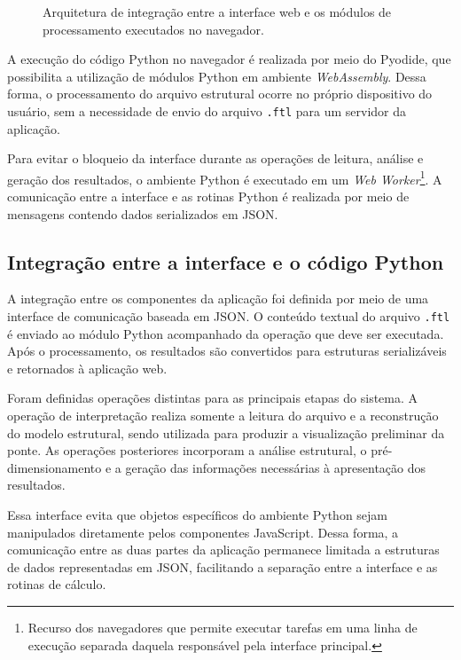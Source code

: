 \begin{figure}[H]
    \centering
    \caption{Arquitetura de integração entre a interface web e os módulos de processamento executados no navegador.}
    \label{fig:arquitetura-web}
    
\end{figure}

A execução do código Python no navegador é realizada por meio do Pyodide, que possibilita a utilização de módulos Python em ambiente \textit{WebAssembly}. Dessa forma, o processamento do arquivo estrutural ocorre no próprio dispositivo do usuário, sem a necessidade de envio do arquivo \texttt{.ftl} para um servidor da aplicação.

Para evitar o bloqueio da interface durante as operações de leitura, análise e geração dos resultados, o ambiente Python é executado em um \textit{Web Worker}\footnote{Recurso dos navegadores que permite executar tarefas em uma linha de execução separada daquela responsável pela interface principal.}. A comunicação entre a interface e as rotinas Python é realizada por meio de mensagens contendo dados serializados em \gls{JSON}.

\subsection{Integração entre a interface e o código Python}
\label{subsec:integracao-pyodide}

A integração entre os componentes da aplicação foi definida por meio de uma interface de comunicação baseada em \gls{JSON}. O conteúdo textual do arquivo \texttt{.ftl} é enviado ao módulo Python acompanhado da operação que deve ser executada. Após o processamento, os resultados são convertidos para estruturas serializáveis e retornados à aplicação web.

Foram definidas operações distintas para as principais etapas do sistema. A operação de interpretação realiza somente a leitura do arquivo e a reconstrução do modelo estrutural, sendo utilizada para produzir a visualização preliminar da ponte. As operações posteriores incorporam a análise estrutural, o pré-dimensionamento e a geração das informações necessárias à apresentação dos resultados.

Essa interface evita que objetos específicos do ambiente Python sejam manipulados diretamente pelos componentes JavaScript. Dessa forma, a comunicação entre as duas partes da aplicação permanece limitada a estruturas de dados representadas em \gls{JSON}, facilitando a separação entre a interface e as rotinas de cálculo.

